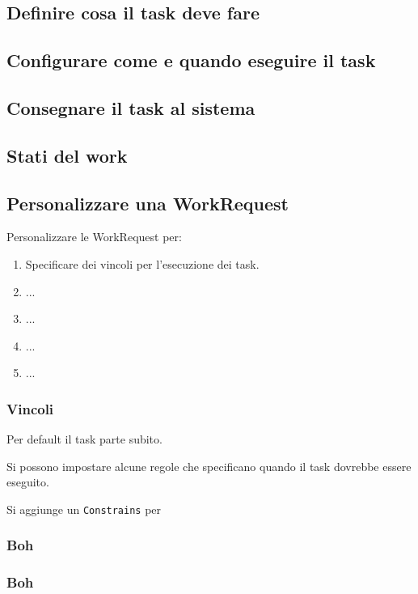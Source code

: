 \subsection{Definire cosa il task deve fare}

\subsection{Configurare come e quando eseguire il task}

\subsection{Consegnare il task al sistema}

\subsection{Stati del work}

\subsection{Personalizzare una WorkRequest}
\par Personalizzare le WorkRequest per:
\begin{enumerate}
    \item Specificare dei vincoli per l'esecuzione dei task.
    \item ...
    \item ...
    \item ...
    \item ...
\end{enumerate}

\subsubsection{Vincoli}
\par Per default il task parte subito.
\par Si possono impostare alcune regole che specificano quando il task dovrebbe essere eseguito.
\par Si aggiunge un \texttt{Constrains} per 

\subsubsection{Boh}

\subsubsection{Boh}

